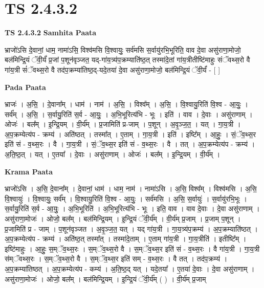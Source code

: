 \documentclass[17pt]{extarticle}
\begin{document}
\section{ TS 2.4.3.2 }

\textbf{TS 2.4.3.2 } \newline
\textbf{Samhita Paata} \newline

भ्राजो॑ऽसि दे॒वानां॒ धाम॒ नामा॑ऽसि॒ विश्व॑मसि वि॒श्वायुः॒ सर्व॑मसि स॒र्वायु॑रभि॒भूरिति॒ वाव दे॒वा असु॑राणा॒मोजो॒ बल॑मिन्द्रि॒यं ॅवी॒र्यं॑ प्र॒जां प॒शून॑वृञ्जत॒ यद्-गा॑य॒त्र्य॑प॒क्रम्याति॑ष्ठ॒त् तस्मा॑दे॒तां गा॑य॒त्रीतीष्टि॑माहुः संॅवथ्स॒रो वै गा॑य॒त्री सं॑ॅवथ्स॒रो वै तद॑प॒क्रम्या॑तिष्ठ॒द्-यदे॒तया॑ दे॒वा असु॑राणा॒मोजो॒ बल॑मिन्द्रि॒यं ॅवी॒र्यं॑ - [  ] \newline

\textbf{Pada Paata} \newline

भ्राजः॑ । अ॒सि॒ । दे॒वाना᳚म् । धाम॑ । नाम॑ । अ॒सि॒ । विश्व᳚म् । अ॒सि॒ । वि॒श्वायु॒रिति॑ वि॒श्व - आ॒युः॒ । सर्व᳚म् । अ॒सि॒ । स॒र्वायु॒रिति॑ स॒र्व - आ॒युः॒ । अ॒भि॒भूरित्य॑भि - भूः । इति॑ । वाव । दे॒वाः । असु॑राणाम् । ओजः॑ । बल᳚म् । इ॒न्द्रि॒यम् । वी॒र्य᳚म् । प्र॒जामिति॑ प्र-जाम् । प॒शून् । अ॒वृ॒ञ्ज॒त॒ । यत् । गा॒य॒त्री । अ॒प॒क्रम्येत्य॑प - क्रम्य॑ । अति॑ष्ठत् । तस्मा᳚त् । ए॒ताम् । गा॒य॒त्री । इति॑ । इष्टि᳚म् । आ॒हुः॒ । सं॒ॅव॒थ्स॒र इति॑ सं - व॒थ्स॒रः । वै । गा॒य॒त्री । सं॒ॅव॒थ्स॒र इति॑ सं - व॒थ्स॒रः । वै । तत् । अ॒प॒क्रम्येत्य॑प - क्रम्य॑ । अ॒ति॒ष्ठ॒त् । यत् । ए॒तया᳚ । दे॒वाः । असु॑राणाम् । ओजः॑ । बल᳚म् । इ॒न्द्रि॒यम् । वी॒र्य᳚म् ।  \newline


\textbf{Krama Paata} \newline

भ्राजो॑ऽसि । अ॒सि॒ दे॒वाना᳚म् । दे॒वानां॒ धाम॑ । धाम॒ नाम॑ । नामा॑ऽसि । अ॒सि॒ विश्व᳚म् । विश्व॑मसि । अ॒सि॒ वि॒श्वायुः॑ । वि॒श्वायुः॒ सर्व᳚म् । वि॒श्वायु॒रिति॑ वि॒श्व - आ॒युः॒ । सर्व॑मसि । अ॒सि॒ स॒र्वायुः॑ । स॒र्वायु॑रभि॒भूः । स॒र्वायु॒रिति॑ स॒र्व - आ॒युः॒ । अ॒भि॒भूरिति॑ । अ॒भि॒भूरित्य॑भि - भूः । इति॒ वाव । वाव दे॒वाः । दे॒वा असु॑राणाम् । असु॑राणा॒मोजः॑ । ओजो॒ बल᳚म् । बल॑मिन्द्रि॒यम् । इ॒न्द्रि॒यं ॅवी॒र्य᳚म् । वी॒र्य॑म् प्र॒जाम् । प्र॒जाम् प॒शून् । प्र॒जामिति॑ प्र - जाम् । प॒शून॑वृञ्जत । अ॒वृ॒ञ्ज॒त॒ यत् । यद् गा॑य॒त्री । गा॒य॒त्र्य॑प॒क्रम्य॑ । अ॒प॒क्रम्याति॑ष्ठत् । अ॒प॒क्रम्येत्य॑प - क्रम्य॑ । अति॑ष्ठ॒त् तस्मा᳚त् । तस्मा॑दे॒ताम् । ए॒ताम् गा॑य॒त्री । गा॒य॒त्रीति॑ । इतीष्टि᳚म् । इष्टि॑माहुः । आ॒हुः॒ स॒म्ॅव॒थ्स॒रः । स॒म्ॅव॒थ्स॒रो वै । स॒म्ॅव॒थ्स॒र इति॑ सं - व॒थ्स॒रः । वै गा॑य॒त्री । गा॒य॒त्री स॑म्ॅवथ्स॒रः । स॒म्ॅव॒थ्स॒रो वै । स॒म्ॅव॒थ्स॒र इति॑ सम् - व॒थ्स॒रः । वै तत् । तद॑प॒क्रम्य॑ । अ॒प॒क्रम्या॑तिष्ठत् । अ॒प॒क्रम्येत्य॑प - कम्य॑ । अ॒ति॒ष्ठ॒द् यत् । यदे॒तया᳚ । ए॒तया॑ दे॒वाः । दे॒वा असु॑राणाम् । असु॑राणा॒मोजः॑ । ओजो॒ बल᳚म् । बल॑मिन्द्रि॒यम् । इ॒न्द्रि॒यं ॅवी॒र्य᳚म् ( ) । 
वी॒र्य॑म् प्र॒जाम् \newline
\end{document}
